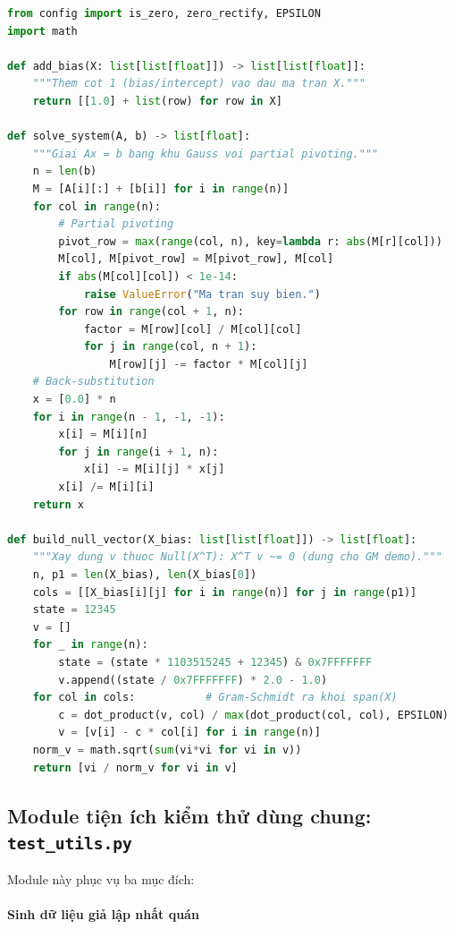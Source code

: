 \begin{lstlisting}[language=Python, caption={Trích đoạn \texttt{utils.py}: các hàm cốt lõi cho OLS}]
from config import is_zero, zero_rectify, EPSILON
import math

def add_bias(X: list[list[float]]) -> list[list[float]]:
    """Them cot 1 (bias/intercept) vao dau ma tran X."""
    return [[1.0] + list(row) for row in X]

def solve_system(A, b) -> list[float]:
    """Giai Ax = b bang khu Gauss voi partial pivoting."""
    n = len(b)
    M = [A[i][:] + [b[i]] for i in range(n)]
    for col in range(n):
        # Partial pivoting
        pivot_row = max(range(col, n), key=lambda r: abs(M[r][col]))
        M[col], M[pivot_row] = M[pivot_row], M[col]
        if abs(M[col][col]) < 1e-14:
            raise ValueError("Ma tran suy bien.")
        for row in range(col + 1, n):
            factor = M[row][col] / M[col][col]
            for j in range(col, n + 1):
                M[row][j] -= factor * M[col][j]
    # Back-substitution
    x = [0.0] * n
    for i in range(n - 1, -1, -1):
        x[i] = M[i][n]
        for j in range(i + 1, n):
            x[i] -= M[i][j] * x[j]
        x[i] /= M[i][i]
    return x

def build_null_vector(X_bias: list[list[float]]) -> list[float]:
    """Xay dung v thuoc Null(X^T): X^T v ~= 0 (dung cho GM demo)."""
    n, p1 = len(X_bias), len(X_bias[0])
    cols = [[X_bias[i][j] for i in range(n)] for j in range(p1)]
    state = 12345
    v = []
    for _ in range(n):
        state = (state * 1103515245 + 12345) & 0x7FFFFFFF
        v.append((state / 0x7FFFFFFF) * 2.0 - 1.0)
    for col in cols:           # Gram-Schmidt ra khoi span(X)
        c = dot_product(v, col) / max(dot_product(col, col), EPSILON)
        v = [v[i] - c * col[i] for i in range(n)]
    norm_v = math.sqrt(sum(vi*vi for vi in v))
    return [vi / norm_v for vi in v]
\end{lstlisting}


\subsection{Module tiện ích kiểm thử dùng chung: \texttt{test\_utils.py}}

Module này phục vụ ba mục đích:

\paragraph{Sinh dữ liệu giả lập nhất quán}


